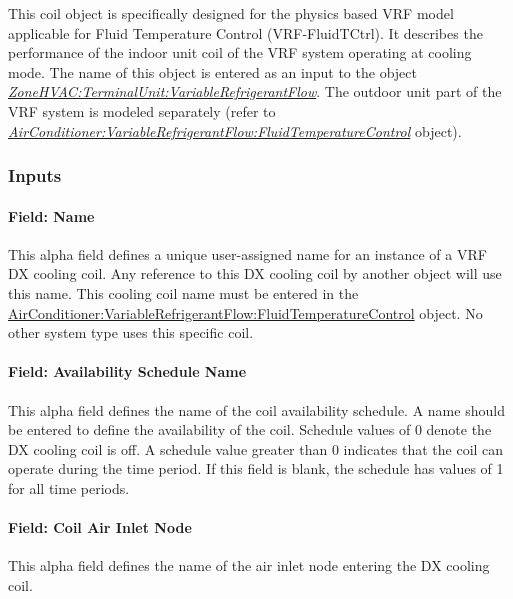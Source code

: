 This coil object is specifically designed for the physics based VRF model applicable for Fluid Temperature Control (VRF-FluidTCtrl). It describes the performance of the indoor unit coil of the VRF system operating at cooling mode. The name of this object is entered as an input to the object \emph{\hyperref[zonehvacterminalunitvariablerefrigerantflow]{ZoneHVAC:TerminalUnit:VariableRefrigerantFlow}}. The outdoor unit part of the VRF system is modeled separately (refer to \emph{\hyperref[airconditionervariablerefrigerantflowfluidtemperaturecontrol]{AirConditioner:VariableRefrigerantFlow:FluidTemperatureControl}} object).

\subsubsection{Inputs}\label{inputs-8-008}

\paragraph{Field: Name}\label{field-name-7-006}

This alpha field defines a unique user-assigned name for an instance of a VRF DX cooling coil. Any reference to this DX cooling coil by another object will use this name. This cooling coil name must be entered in the \hyperref[airconditionervariablerefrigerantflowfluidtemperaturecontrol]{AirConditioner:VariableRefrigerantFlow:FluidTemperatureControl} object. No other system type uses this specific coil.

\paragraph{Field: Availability Schedule Name}\label{field-availability-schedule-name-3-003}

This alpha field defines the name of the coil availability schedule. A name should be entered to define the availability of the coil. Schedule values of 0 denote the DX cooling coil is off. A schedule value greater than 0 indicates that the coil can operate during the time period. If this field is blank, the schedule has values of 1 for all time periods.

\paragraph{Field: Coil Air Inlet Node}\label{field-coil-air-inlet-node-1}

This alpha field defines the name of the air inlet node entering the DX cooling coil.

